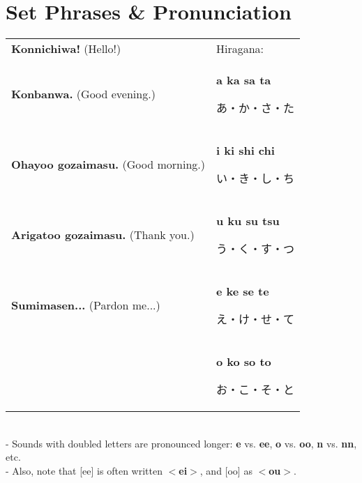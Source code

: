 \documentclass[11pt]{article} %
\begin{document}
\section{Set Phrases \& Pronunciation}

\begin{tabular}{l || l}

\textbf{Konnichiwa!} (Hello!) & Hiragana:\\
\textbf{Konbanwa.} (Good evening.) & \textbf{a ka sa ta} 
\begin{CJK}{UTF8}{min}あ・か・さ・た\end{CJK}\\
\textbf{Ohayoo gozaimasu.} (Good morning.) & \textbf{i ki shi chi} 
\begin{CJK}{UTF8}{min}い・き・し・ち\end{CJK}\\
\textbf{Arigatoo gozaimasu.} (Thank you.)  & \textbf{u ku su tsu} 
\begin{CJK}{UTF8}{min}う・く・す・つ\end{CJK}\\
\textbf{Sumimasen...} (Pardon me...)		& \textbf{e ke se te} 
\begin{CJK}{UTF8}{min}え・け・せ・て\end{CJK}\\
											& \textbf{o ko so to} 
\begin{CJK}{UTF8}{min}お・こ・そ・と\end{CJK}
\end{tabular}\\
- Sounds with doubled letters are pronounced longer: \textbf{e} vs. \textbf{ee}, \textbf{o} vs. \textbf{oo}, \textbf{n} vs. \textbf{nn}, etc.\\
- Also, note that [ee] is often written $<$\textbf{ei}$>$, and [oo] as $<$\textbf{ou}$>$.
\end{document}
